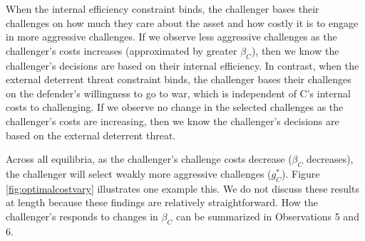 \documentclass[11pt,letterpaper,pdftex,dvipsnames,table]{article}
\begin{document}
When the internal efficiency constraint binds, the challenger bases their challenges on how much they care about the asset and how costly it is to engage in more aggressive challenges. If we observe less aggressive challenges as the challenger's costs increases (approximated by greater $\beta_{C}$), then we know the challenger's decisions are based on their internal efficiency. In contrast, when the external deterrent threat constraint binds, the challenger bases their challenges on the defender's willingness to go to war, which is independent of C's internal costs to challenging. If we observe no change in the selected challenges as the challenger's costs are increasing, then we know the challenger's decisions are based on the external deterrent threat.

Across all equilibria, as the challenger's challenge costs decrease ($\beta_{C}$ decreases), the challenger will select weakly more aggressive challenges ($g_{C}^{*}$). Figure \ref{fig:optimalcostvary} illustrates one example this. We do not discuss these results at length because these findings are relatively straightforward. How the challenger's responds to changes in $\beta_C$ can be summarized in Observations 5 and 6.
\end{document}
